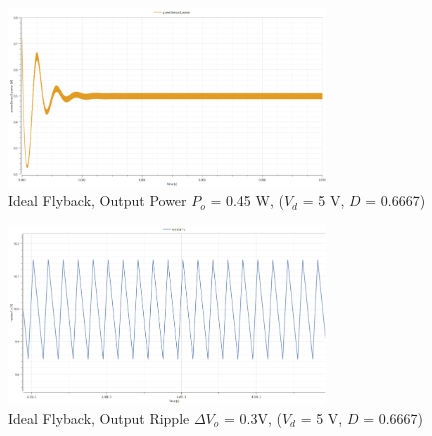 \documentclass[12pt,twoside]{scrartcl}
\begin{document}
\begin{figure}[htp]
    \centering
    \includegraphics[width=0.75\textwidth]{PowerIdealSim12V.png}
    \caption{Ideal Flyback, Output Power $P_o$ = 0.45 W, ($V_d$ = 5 V, $D$ = 0.6667)}
    \label{fig:PowerIdealSim5V}
\end{figure}

\begin{figure}[htp]
    \centering
    \includegraphics[width=0.75\textwidth]{RippleIdealSim5V.png}
    \caption{Ideal Flyback, Output Ripple $\Delta V_o$ = 0.3V, ($V_d$ = 5 V, $D$ = 0.6667)}
    \label{fig:RippleIdealSim5V}
\end{figure}


\newpage
\end{document}
